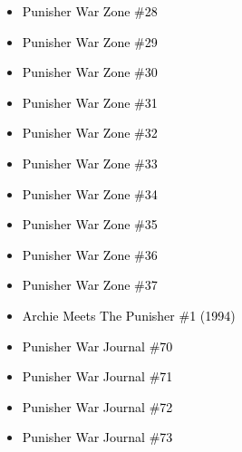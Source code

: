 \documentclass[12pt]{article}
\newcommand{\checkbox}{\raisebox{0.0ex}{\fbox{\rule{0ex}{1.5ex} \rule{1.5ex}{0ex}}}}
\begin{document}
\vspace{0.3cm}
\noindent
\begin{tcolorbox}[
  colback=white!95!gray,
  colframe=black,
  width=\textwidth,
  arc=4mm,
  auto outer arc,
  boxrule=0.8pt,
  left=8pt,right=8pt,top=8pt,bottom=8pt
]
\begin{itemize}[left=0pt,label={\checkbox}]
    \item \textcolor{black}{Punisher War Zone \#28}
    \item \textcolor{black}{Punisher War Zone \#29}
    \item \textcolor{black}{Punisher War Zone \#30}
    \item \textcolor{black}{Punisher War Zone \#31}
    \item \textcolor{black}{Punisher War Zone \#32}
    \item \textcolor{black}{Punisher War Zone \#33}
    \item \textcolor{black}{Punisher War Zone \#34}
    \item \textcolor{black}{Punisher War Zone \#35}
    \item \textcolor{black}{Punisher War Zone \#36}
    \item \textcolor{black}{Punisher War Zone \#37}
    \item \textcolor{black}{Archie Meets The Punisher \#1 (1994)}
    \item \textcolor{black}{Punisher War Journal \#70}
    \item \textcolor{black}{Punisher War Journal \#71}
    \item \textcolor{black}{Punisher War Journal \#72}
    \item \textcolor{black}{Punisher War Journal \#73}
\end{itemize}
\end{tcolorbox}

\newpage
{}
\end{document}
